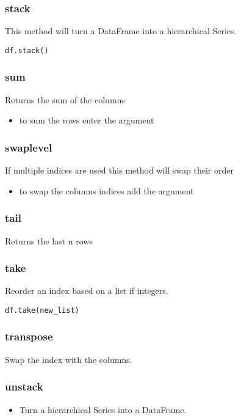 %
\subsubsection{stack}
This method will turn a DataFrame into a hierarchical Series.
{\color{red}{Note: the null values will be removed.}}

\begin{lstlisting}
df.stack()
\end{lstlisting}

%
\subsubsection{sum}
Returns the sum of the columns
  \begin{itemize}

    \item to sum the rows enter the argument \color{red}{axis=1}
  \end{itemize}

%
\subsubsection{swaplevel}
If multiple indices are used this method will swap their order
  \begin{itemize}

    \item to swap the columns indices add the argument {\color{red}{axis=1}}
  \end{itemize}

%
\subsubsection{tail}
Returns the last n rows

%
\subsubsection{take}
Reorder an index based on a list if integers.

\begin{lstlisting}
df.take(new_list)
\end{lstlisting}

%
\subsubsection{transpose}
Swap the index with the columns.

%
\subsubsection{unstack}
\begin{itemize}
  \item Turn a hierarchical Series into a DataFrame.
\end{itemize}

